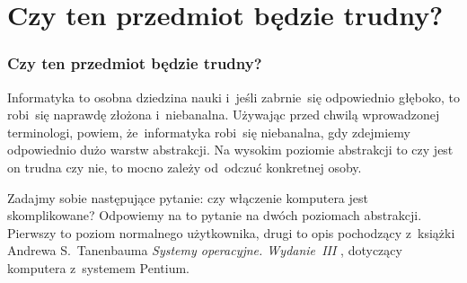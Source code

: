 \documentclass[10pt,t]{beamer}
\begin{document}
\begin{frame}


\end{frame}










\section{Czy ten przedmiot będzie trudny?}



\begin{frame}
  \frametitle{Czy ten przedmiot będzie trudny?}


  Informatyka to osobna dziedzina nauki i~jeśli zabrnie~się odpowiednio
  głęboko, to robi~się naprawdę złożona i~niebanalna. Używając przed chwilą
  wprowadzonej terminologi, powiem, że~informatyka robi~się niebanalna, gdy
  zdejmiemy odpowiednio dużo warstw abstrakcji. Na wysokim poziomie
  abstrakcji to czy jest on trudna czy nie, to mocno zależy od~odczuć
  konkretnej osoby.

  Zadajmy sobie następujące pytanie: czy włączenie komputera jest
  skomplikowane? Odpowiemy na to pytanie na dwóch poziomach abstrakcji.
  Pierwszy to poziom normalnego użytkownika, drugi to opis pochodzący
  z~książki Andrewa S.~Tanenbauma \textit{Systemy operacyjne. Wydanie~III}
  \parencite{Tannenbaum-Systemy-Operacyjne-Wydanie-III-Pub-2013}, dotyczący
  komputera z~systemem Pentium.

\end{frame}
\end{document}
